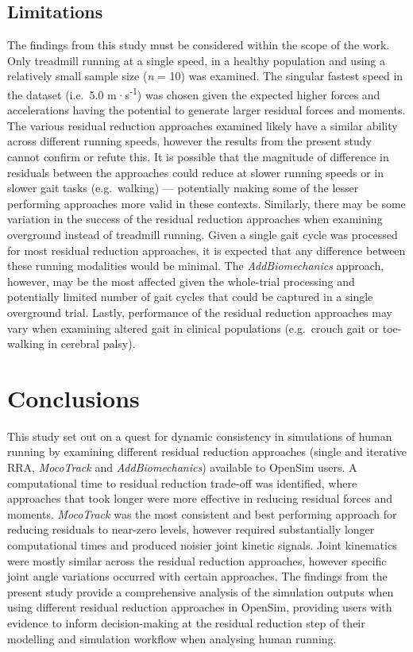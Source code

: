 \documentclass[]{elsarticle} %
\begin{document}
\hypertarget{limitations}{%
\subsection{Limitations}\label{limitations}}

The findings from this study must be considered within the scope of the
work. Only treadmill running at a single speed, in a healthy population
and using a relatively small sample size (\emph{n} = 10) was examined.
The singular fastest speed in the dataset (i.e.~5.0
m·s\textsuperscript{-1}) was chosen given the expected higher forces and
accelerations having the potential to generate larger residual forces
and moments. The various residual reduction approaches examined likely
have a similar ability across different running speeds, however the
results from the present study cannot confirm or refute this. It is
possible that the magnitude of difference in residuals between the
approaches could reduce at slower running speeds or in slower gait tasks
(e.g.~walking) --- potentially making some of the lesser performing
approaches more valid in these contexts. Similarly, there may be some
variation in the success of the residual reduction approaches when
examining overground instead of treadmill running. Given a single gait
cycle was processed for most residual reduction approaches, it is
expected that any difference between these running modalities would be
minimal. The \emph{AddBiomechanics} approach, however, may be the most
affected given the whole-trial processing and potentially limited number
of gait cycles that could be captured in a single overground trial.
Lastly, performance of the residual reduction approaches may vary when
examining altered gait in clinical populations (e.g.~crouch gait or
toe-walking in cerebral palsy).

\hypertarget{conclusions}{%
\section{Conclusions}\label{conclusions}}

This study set out on a quest for dynamic consistency in simulations of
human running by examining different residual reduction approaches
(single and iterative RRA, \emph{MocoTrack} and \emph{AddBiomechanics})
available to OpenSim users. A computational time to residual reduction
trade-off was identified, where approaches that took longer were more
effective in reducing residual forces and moments. \emph{MocoTrack} was
the most consistent and best performing approach for reducing residuals
to near-zero levels, however required substantially longer computational
times and produced noisier joint kinetic signals. Joint kinematics were
mostly similar across the residual reduction approaches, however
specific joint angle variations occurred with certain approaches. The
findings from the present study provide a comprehensive analysis of the
simulation outputs when using different residual reduction approaches in
OpenSim, providing users with evidence to inform decision-making at the
residual reduction step of their modelling and simulation workflow when
analysing human running.
\end{document}
